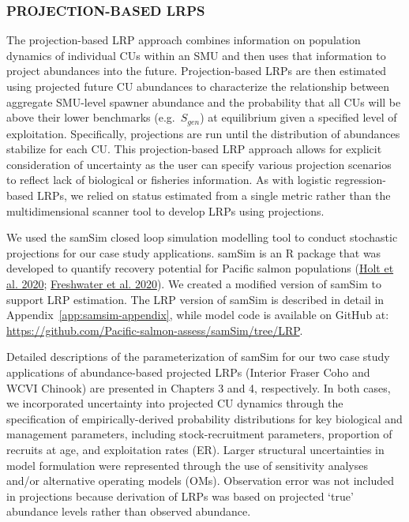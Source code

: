 \documentclass[11pt]{book}
\begin{document}
\hypertarget{projectedMethods}{%
\subsubsection{PROJECTION-BASED LRPS}\label{projectedMethods}}

The projection-based LRP approach combines information on population dynamics of individual CUs within an SMU and then uses that information to project abundances into the future. Projection-based LRPs are then estimated using projected future CU abundances to characterize the relationship between aggregate SMU-level spawner abundance and the probability that all CUs will be above their lower benchmarks (e.g.~\(S_{gen}\)) at equilibrium given a specified level of exploitation. Specifically, projections are run until the distribution of abundances stabilize for each CU. This projection-based LRP approach allows for explicit consideration of uncertainty as the user can specify various projection scenarios to reflect lack of biological or fisheries information. As with logistic regression-based LRPs, we relied on status estimated from a single metric rather than the multidimensional scanner tool to develop LRPs using projections.

We used the samSim closed loop simulation modelling tool to conduct stochastic projections for our case study applications. samSim is an R package that was developed to quantify recovery potential for Pacific salmon populations (\protect\hyperlink{ref-holtQuantitativeToolEvaluating2020}{Holt et al. 2020}; \protect\hyperlink{ref-freshwaterBenefitsLimitationsIncreasing2020}{Freshwater et al. 2020}). We created a modified version of samSim to support LRP estimation. The LRP version of samSim is described in detail in Appendix~\ref{app:samsim-appendix}, while model code is available on GitHub at: \url{https://github.com/Pacific-salmon-assess/samSim/tree/LRP}.

Detailed descriptions of the parameterization of samSim for our two case study applications of abundance-based projected LRPs (Interior Fraser Coho and WCVI Chinook) are presented in Chapters 3 and 4, respectively. In both cases, we incorporated uncertainty into projected CU dynamics through the specification of empirically-derived probability distributions for key biological and management parameters, including stock-recruitment parameters, proportion of recruits at age, and exploitation rates (ER). Larger structural uncertainties in model formulation were represented through the use of sensitivity analyses and/or alternative operating models (OMs). Observation error was not included in projections because derivation of LRPs was based on projected `true' abundance levels rather than observed abundance.
\end{document}
